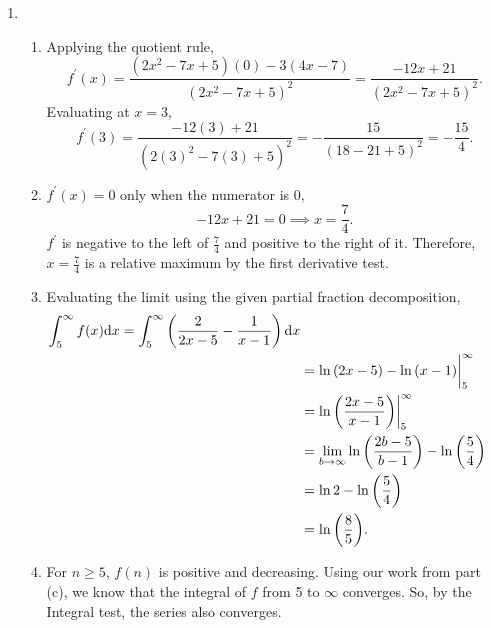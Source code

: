 \begin{enumerate}
	\item \begin{enumerate}
		\item Applying the quotient rule,
			\begin{equation*}
				f^\prime(x) = \frac{(2x^2-7x+5)(0)-3(4x-7)}{(2x^2-7x+5)^2} = \frac{-12x+21}{(2x^2-7x+5)^2}.
			\end{equation*}
			Evaluating at $x=3$,
			\begin{equation*}
				f^\prime(3) = \frac{-12(3)+21}{(2(3)^2-7(3)+5)^2} = -\frac{15}{(18-21+5)^2} = -\frac{15}{4}.
			\end{equation*}
		\item $f^\prime(x)=0$ only when the numerator is 0,
			\begin{equation*}
				-12x + 21 = 0 \implies x = \frac{7}{4}.
			\end{equation*}
			$f^\prime$ is negative to the left of $\frac{7}{4}$ and positive to the right of it.
			Therefore, $x=\frac{7}{4}$ is a relative maximum by the first derivative test.
		\item Evaluating the limit using the given partial fraction decomposition,
			\begin{align*}
				\int_{5}^{\infty}{f(x)\mathrm{d} x} = \int_{5}^{\infty}{\left(\frac{2}{2x-5}-\frac{1}{x-1}\right)\mathrm{d} x} \\
				&= \ln{(2x-5)} - \ln{(x-1)} \biggr\rvert_{5}^{\infty} \\
				&= \ln{\left(\frac{2x-5}{x-1}\right)} \biggr\rvert_{5}^{\infty} \\
				&= \lim_{b\to\infty}{\ln{\left(\frac{2b-5}{b-1}\right)}} - \ln{\left(\frac{5}{4}\right)} \\
				&= \ln{2} - \ln{\left(\frac{5}{4}\right)} \\
				&= \ln{\left(\frac{8}{5}\right)}.
			\end{align*}
		\item For $n \geq 5$, $f(n)$ is positive and decreasing.
			Using our work from part (c), we know that the integral of $f$ from 5 to $\infty$ converges.
			So, by the Integral test, the series also converges.
	\end{enumerate}


\end{enumerate}
